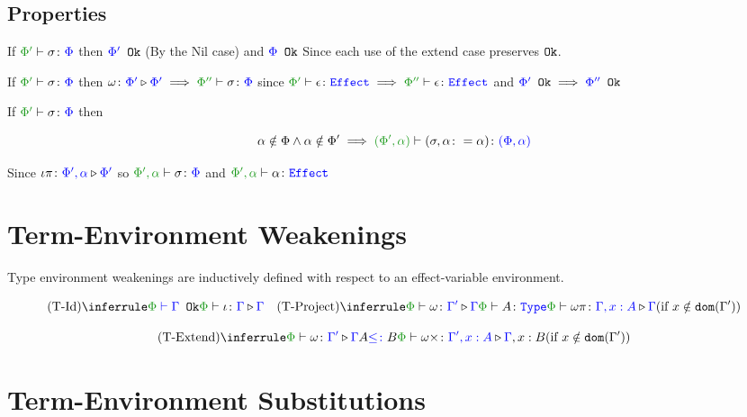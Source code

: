 \documentclass{report}
\begin{document}
    \subsection{Properties}
        
        \begin{property}[Wellformedness]\label{EffectSubsPropertyOne}
            If $\typerelation{\P'}{\si}{\P}$ then ${\color{blue} \Phi'} \texttt{ Ok}$ (By  the 
            Nil case) and ${\color{blue} \Phi} \texttt{ Ok}$ Since each use of the extend case preserves $\texttt{Ok}$.
        \end{property}

        \begin{property}[Weakening]\label{EffectSubsPropertyTwo}
            If $\typerelation{\P'}{\si}{\P}$ then $\wrelw{\P'}{\P'} \implies \typerelation{\P''}{\si}{\P}$ since $\wellformede{\P'}{\e}\implies \wellformede{\P''}{\e}$ and ${\color{blue} \Phi'} \texttt{ Ok}\implies {\color{blue} \Phi''} \texttt{ Ok}$
        \end{property}

        \begin{property}[Extension]\label{EffectSubsPropertyThree}
            If $\typerelation{\P'}{\si}{\P}$ then
        
            \begin{equation}
                \a\notin\P\wedge\a\notin\P' \implies \typerelation{(\P', \a)}{(\si, \a\setto\a)}{(\P,\a)}
            \end{equation}

            Since $\iota\pi \colon {\color{blue}\Phi',\alpha} \triangleright {\color {blue} \Phi'}$ so $\typerelation{\P',\a}{\si}{\P}$ and $\wellformede{\P',\a}{\a}$        
        \end{property}

\section{Term-Environment Weakenings}
Type environment weakenings are inductively defined with respect to an effect-variable environment.


\[
    \ntreeruleI{\tid}{\wellformedok{\P}{\G}}{\pewrel{\i}{\G}{\G}}
    \quad  
    \condtreeruleII{\tproject}{\pewrel{\w}{\G'}{\G}}{\typerelation{\P}{A}{\type}}{\pewrel{\w \pi}{\G, x: A}{\G}}{x \notin \dom{\G'}}
\]

\[
    \condtreeruleII{\textend}{\pewrel{\w}{\G'}{\G}}{ A \subtype B}{\pewrel{\w \x}{\G', x: A}{\G, x: B}}{x \notin \dom{\G'}}
\]

\section{Term-Environment Substitutions}
\end{document}
